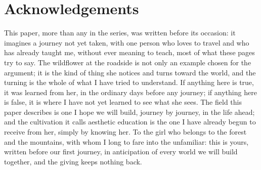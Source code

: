 \section*{Acknowledgements}

\noindent
This paper, more than any in the series, was written before its occasion: it imagines a journey not yet taken, with one person who loves to travel and who has already taught me, without ever meaning to teach, most of what these pages try to say. The wildflower at the roadside is not only an example chosen for the argument; it is the kind of thing she notices and turns toward the world, and the turning is the whole of what I have tried to understand. If anything here is true, it was learned from her, in the ordinary days before any journey; if anything here is false, it is where I have not yet learned to see what she sees. The field this paper describes is one I hope we will build, journey by journey, in the life ahead; and the cultivation it calls aesthetic education is the one I have already begun to receive from her, simply by knowing her. To the girl who belongs to the forest and the mountains, with whom I long to fare into the unfamiliar: this is yours, written before our first journey, in anticipation of every world we will build together, and the giving keeps nothing back.

